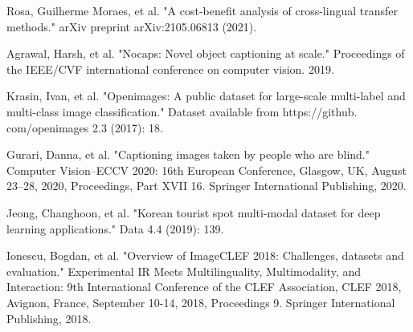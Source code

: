 \documentclass[runningheads]{llncs}
\begin{document}
\begin{thebibliography}{8}
Rosa, Guilherme Moraes, et al. "A cost-benefit analysis of cross-lingual transfer methods." arXiv preprint arXiv:2105.06813 (2021).

Agrawal, Harsh, et al. "Nocaps: Novel object captioning at scale." Proceedings of the IEEE/CVF international conference on computer vision. 2019.

Krasin, Ivan, et al. "Openimages: A public dataset for large-scale multi-label and multi-class image classification." Dataset available from https://github. com/openimages 2.3 (2017): 18.

Gurari, Danna, et al. "Captioning images taken by people who are blind." Computer Vision–ECCV 2020: 16th European Conference, Glasgow, UK, August 23–28, 2020, Proceedings, Part XVII 16. Springer International Publishing, 2020.

Jeong, Changhoon, et al. "Korean tourist spot multi-modal dataset for deep learning applications." Data 4.4 (2019): 139.

Ionescu, Bogdan, et al. "Overview of ImageCLEF 2018: Challenges, datasets and evaluation." Experimental IR Meets Multilinguality, Multimodality, and Interaction: 9th International Conference of the CLEF Association, CLEF 2018, Avignon, France, September 10-14, 2018, Proceedings 9. Springer International Publishing, 2018.

\end{thebibliography}
\end{document}
